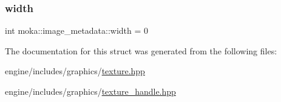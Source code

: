 \mbox{\label{structmoka_1_1image__metadata_a8172657e9eff1d1b405268b99fad312f}} 
\subsubsection{\texorpdfstring{width}{width}}
{\footnotesize\ttfamily int moka\+::image\+\_\+metadata\+::width = 0}



The documentation for this struct was generated from the following files\+:\begin{DoxyCompactItemize}
\item 
engine/includes/graphics/\mbox{\hyperlink{texture_8hpp}{texture.\+hpp}}\item 
engine/includes/graphics/\mbox{\hyperlink{texture__handle_8hpp}{texture\+\_\+handle.\+hpp}}\end{DoxyCompactItemize}
